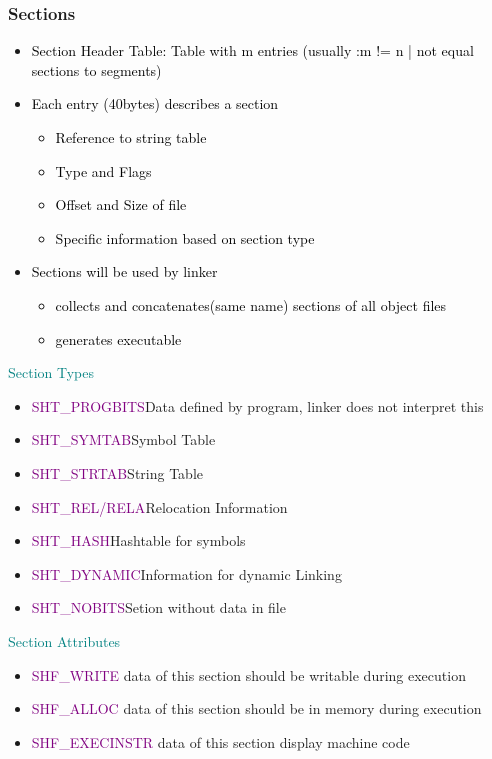 \documentclass[main.tex,fontsize=8pt,paper=a4,paper=portrait,DIV=calc,]{scrartcl}
\begin{document}
\subsubsection{Sections}
\begin{itemize}
\item \textcolor{black}{Section Header Table: Table with m entries (usually :m != n | not equal sections to segments)}
\item \textcolor{black}{Each entry (40bytes) describes a section}\newline
  \begin{itemize}
  \item \textcolor{black}{Reference to string table }
  \item \textcolor{black}{Type and Flags}
  \item \textcolor{black}{Offset and Size of file}
  \item \textcolor{black}{Specific information based on section type}
  \end{itemize} 
\item \textcolor{black}{Sections will be used by linker}\newline
  \begin{itemize}
  \item \textcolor{black}{collects and concatenates(same name) sections of all object files}
  \item \textcolor{black}{generates executable}
  \end{itemize} 
\end{itemize} 
\textcolor{teal}{Section Types}
\begin{itemize}
\item \textcolor{purple}{SHT\_PROGBITS}Data defined by program, linker does not interpret this
\item \textcolor{purple}{SHT\_SYMTAB}Symbol Table
\item \textcolor{purple}{SHT\_STRTAB}String Table
\item \textcolor{purple}{SHT\_REL/RELA}Relocation Information
\item \textcolor{purple}{SHT\_HASH}Hashtable for symbols
\item \textcolor{purple}{SHT\_DYNAMIC}Information for dynamic Linking
\item \textcolor{purple}{SHT\_NOBITS}Setion without data in file
\end{itemize} 
\textcolor{teal}{Section Attributes}
\begin{itemize}
\item \textcolor{purple}{SHF\_WRITE} data of this section should be writable during execution
\item \textcolor{purple}{SHF\_ALLOC} data of this section should be in memory during execution
\item \textcolor{purple}{SHF\_EXECINSTR} data of this section display machine code
\end{itemize} 
\end{document}
